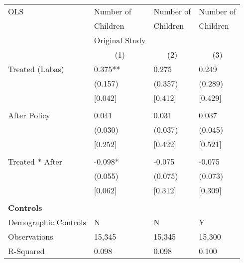 \begin{tabular}{p{4cm}p{1.5cm}p{1.5cm}p{1.5cm}}
\hline\hline
OLS               &Number of & Number of &Number of \\
&Children & Children & Children\\
&Original Study & &  \\
&\multicolumn{1}{c}{(1)}&\multicolumn{1}{c}{(2)}&\multicolumn{1}{c}{(3)}\\
\hline
Treated (Labas)   &  0.375**&   0.275 & 0.249 \\
                &  (0.157)&  (0.357) & (0.289)\\
									& [0.042]	 &  [0.412]&  [0.429]\\										
                \\
After Policy   &   0.041&   0.031 &0.037\\
                &  (0.030)&  (0.037) & (0.045)\\
									& [0.252]	 &  [0.422]&  [0.521]\\										
                \\
Treated * After   & -0.098*&  -0.075 & -0.075\\
                &  (0.055)&  (0.075) &(0.073)\\
									& [0.062]	 &  [0.312]&  [0.309]\\										
                \\

\multicolumn{4}{l}{\textbf{Controls}}  \\                  
Demographic Controls       &   N     &        N&        Y\\

\hline
Observations    &    15,345&    15,345 & 15,300\\
R-Squared    &  0.098   & 0.098 & 0.100     \\
\hline\hline
\end{tabular}
